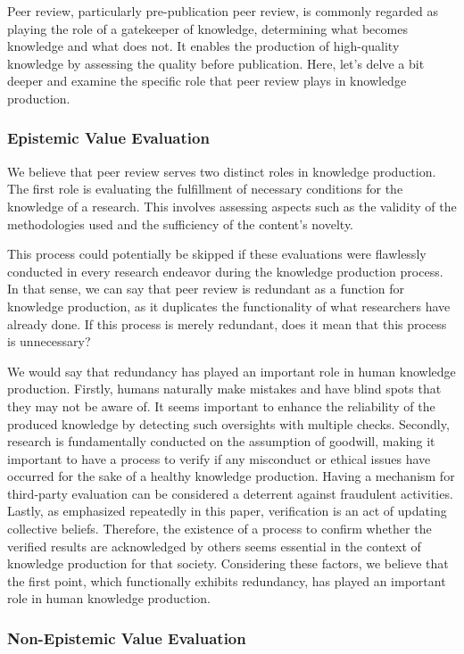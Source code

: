\documentclass{book}
\begin{document}
Peer review, particularly pre-publication peer review, is commonly regarded as playing the role of a gatekeeper of knowledge, determining what becomes knowledge and what does not. It enables the production of high-quality knowledge by assessing the quality before publication. Here, let's delve a bit deeper and examine the specific role that peer review plays in knowledge production.

\subsubsection{Epistemic Value Evaluation}

We believe that peer review serves two distinct roles in knowledge production. The first role is evaluating the fulfillment of necessary conditions for the knowledge of a research. This involves assessing aspects such as the validity of the methodologies used and the sufficiency of the content's novelty. 

This process could potentially be skipped if these evaluations were flawlessly conducted in every research endeavor during the knowledge production process. In that sense, we can say that peer review is redundant as a function for knowledge production, as it duplicates the functionality of what researchers have already done. If this process is merely redundant, does it mean that this process is unnecessary?

We would say that redundancy has played an important role in human knowledge production. Firstly, humans naturally make mistakes and have blind spots that they may not be aware of. It seems important to enhance the reliability of the produced knowledge by detecting such oversights with multiple checks. Secondly, research is fundamentally conducted on the assumption of goodwill, making it important to have a process to verify if any misconduct or ethical issues have occurred for the sake of a healthy knowledge production. Having a mechanism for third-party evaluation can be considered a deterrent against fraudulent activities. Lastly, as emphasized repeatedly in this paper, verification is an act of updating collective beliefs. Therefore, the existence of a process to confirm whether the verified results are acknowledged by others seems essential in the context of knowledge production for that society. Considering these factors, we believe that the first point, which functionally exhibits redundancy, has played an important role in human knowledge production.

\subsubsection{Non-Epistemic Value Evaluation}
\end{document}
